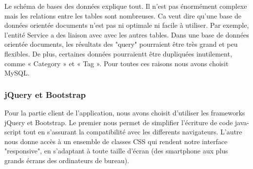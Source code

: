 Le schéma de bases des données explique tout. Il n’est pas énormément complexe mais les relations entre les tables sont nombreuses. Ca veut dire qu'une base de données orientée documents n’est pas ni optimale ni facile à utiliser. Par exemple, l'entité Service a des liaison avec avec les autres tables. Dans une base de données orientée documents, les résultats des "query" pourraient être très grand et peu flexibles. De plus, certaines données pourraientt être dupliquées inutilement, comme « Category » et « Tag ».
\newline
Pour toutes ces raisons nous avons choisit MySQL.

\subsubsection{jQuery et Bootstrap}
Pour la partie client de l'application, nous avons choisit d'utiliser les frameworks jQuery et Bootstrap. Le premier nous permet de simplifier l'écriture de code java-script tout en s'assurant la compatibilité avec les differents navigateurs. L'autre nous donne accès à un ensemble de classes CSS qui rendent notre interface "responsive", en s'adaptant à toute taille d'écran (des smartphone aux plus grands écrans des ordinateurs de bureau).
